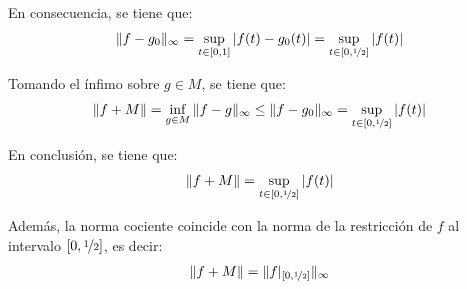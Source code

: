 \begin{ejercicio}
En consecuencia, se tiene que:
\begin{align*}
    \|f - g_0\|_\infty = \sup\limits_{t \in [0, 1]} |f(t) - g_0(t)| = \sup\limits_{t \in [0, \nicefrac{1}{2}]} |f(t)|
\end{align*}

Tomando el ínfimo sobre $g \in M$, se tiene que:
\begin{align*}
    \|f + M\| = \inf\limits_{g \in M} \|f - g\|_\infty \leq \|f - g_0\|_\infty = \sup\limits_{t \in [0, \nicefrac{1}{2}]} |f(t)|
\end{align*}

En conclusión, se tiene que:
\begin{align*}
    \|f + M\| = \sup\limits_{t \in [0, \nicefrac{1}{2}]} |f(t)|
\end{align*}

Además, la norma cociente coincide con la norma de la restricción de $f$ al intervalo $[0, \nicefrac{1}{2}]$, es decir:
\begin{align*}
    \|f + M\| = \|f|_{[0, \nicefrac{1}{2}]}\|_\infty
\end{align*}

\end{ejercicio}

